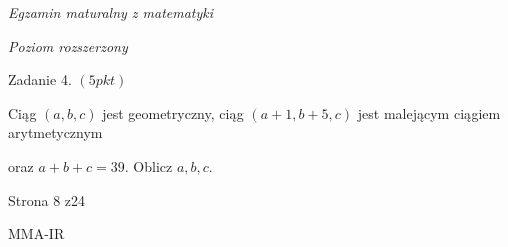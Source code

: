 \documentclass[a4paper,12pt]{article}
\begin{document}
{\it Egzamin maturalny z matematyki}

{\it Poziom rozszerzony}

Zadanie 4. $(5pkt)$

Ciąg $(a,b,c)$ jest geometryczny, ciąg $(a+1,b+5,c)$ jest malejącym ciągiem arytmetycznym

oraz $a+b+c=39$. Oblicz $a, b, c.$

Strona 8 z24

MMA-IR
\end{document}

